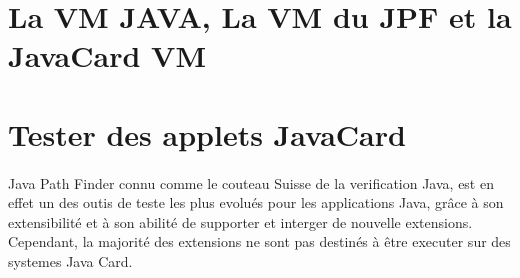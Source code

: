   \section{La VM JAVA, La VM du JPF et la JavaCard VM}
  \section{Tester des applets JavaCard}
  \paragraph{}
    Java Path Finder connu comme le couteau Suisse de la verification Java,
    est en effet un des outis de teste les plus evolués pour les applications Java,
    grâce à son extensibilité et à son abilité de supporter et interger de nouvelle extensions.
    Cependant, la majorité des extensions ne sont pas destinés à être executer sur des systemes Java Card.